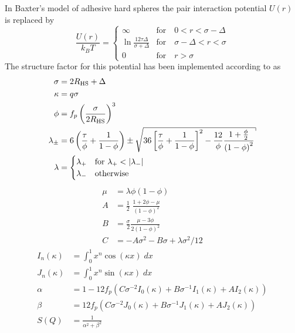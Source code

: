 In Baxter's model of adhesive hard spheres the pair interaction
potential $U(r)$ is replaced by
\begin{equation}
\frac{U(r)}{k_BT} =
 \begin{cases}
      \infty    & \text{for} \quad 0<r<\sigma-\Delta \\
      \ln\frac{12\tau\Delta}{\sigma+\Delta} & \text{for} \quad \sigma-\Delta<r<\sigma \\
      0         & \text{for} \quad r>\sigma
   \end{cases}
\end{equation}
The structure factor for this potential has been implemented according to  \cite{Regnaut1989,Regnaut1990} as
\begin{align}
\sigma &= 2R_\text{HS}+\Delta \\
\kappa & = q \sigma \\
\phi   &= f_p \left(\frac{\sigma}{2R_\text{HS}}\right)^3 \\
\lambda_{\pm} & =6 \left(\frac{\tau}{\phi}+\frac{1}{1-\phi}\right)
                \pm \sqrt{
                    36 \left[
                        \frac{\tau}{\phi}+\frac{1}{1-\phi}
                      \right]^2
                   -\frac{12}{\phi}\frac{1+\frac{\phi}{2}}{\left(1-\phi\right)^{2}}
                } \label{eq:sHS2_lambda}\\
   \lambda & =
       \begin{cases}
           \lambda_+ & \mbox{for }\lambda_+ < \abs{\lambda_-} \\
           \lambda_- & \mbox{otherwise}
       \end{cases}
\end{align}
\begin{align}
\mu & = \lambda \phi (1-\phi) \\
A & = \frac12 \; \frac{1+2 \phi-\mu}{\left(1-\phi\right)^2} \\
B & = \frac{\sigma}{2} \frac{\mu-3\phi}{2 \left(1-\phi\right)^2 } \\
C & = -A\sigma^2-B\sigma+\lambda\sigma^2/12
\end{align}
\begin{align}
I_n(\kappa) &= \int_0^1 x^n \cos(\kappa x)\; dx \\
J_n(\kappa) &= \int_0^1 x^n \sin(\kappa x)\; dx \\
\alpha & = 1-12 f_p \left( C\sigma^{-2}I_0(\kappa) + B\sigma^{-1} I_1(\kappa) +AI_2(\kappa) \right)\\
\beta  &=    12 f_p \left( C\sigma^{-2}J_0(\kappa) + B\sigma^{-1} J_1(\kappa) +AJ_2(\kappa) \right) \\
S(Q) & = \frac{1}{\alpha^2+\beta^2}
\end{align}


